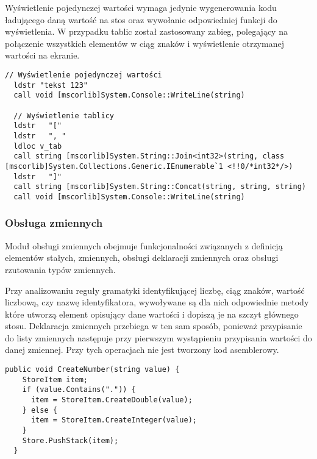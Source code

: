 \par Wyświetlenie pojedynczej wartości wymaga jedynie wygenerowania kodu ładującego daną wartość na stos oraz wywołanie odpowiedniej funkcji do wyświetlenia. W przypadku tablic został zastosowany zabieg, polegający na połączenie wszystkich elementów w ciąg znaków i wyświetlenie otrzymanej wartości na ekranie.

\begin{lstlisting}[language=IL, caption=Przykład wygenerowanego kodu assemblera dla funkcji wyjścia standardowego, label=alg:consolelogAsm]
  // Wyświetlenie pojedynczej wartości
  ldstr "tekst 123"
  call void [mscorlib]System.Console::WriteLine(string)

  // Wyświetlenie tablicy
  ldstr   "["
  ldstr   ", "
  ldloc v_tab
  call string [mscorlib]System.String::Join<int32>(string, class [mscorlib]System.Collections.Generic.IEnumerable`1 <!!0/*int32*/>)
  ldstr   "]"
  call string [mscorlib]System.String::Concat(string, string, string)
  call void [mscorlib]System.Console::WriteLine(string)
\end{lstlisting}

\subsubsection{Obsługa zmiennych}

\par Moduł obsługi zmiennych obejmuje funkcjonalności związanych z definicją elementów stałych, zmiennych, obsługi deklaracji zmiennych oraz obsługi rzutowania typów zmiennych. \par Przy analizowaniu reguły gramatyki identyfikującej liczbę, ciąg znaków, wartość liczbową, czy nazwę identyfikatora, wywoływane są dla nich odpowiednie metody które utworzą element opisujący dane wartości i dopiszą je na szczyt głównego stosu. Deklaracja zmiennych przebiega w ten sam sposób, ponieważ przypisanie do listy zmiennych następuje przy pierwszym wystąpieniu przypisania wartości do danej zmiennej. Przy tych operacjach nie jest tworzony kod asemblerowy.

\begin{lstlisting}[language=CSharp, caption=Implementacja funkcji tworzącej element opisujący stałą liczbową, label=alg:variable1]
  public void CreateNumber(string value) {
    StoreItem item;
    if (value.Contains(".")) {
      item = StoreItem.CreateDouble(value);
    } else {
      item = StoreItem.CreateInteger(value);
    }
    Store.PushStack(item);
  }
\end{lstlisting}

